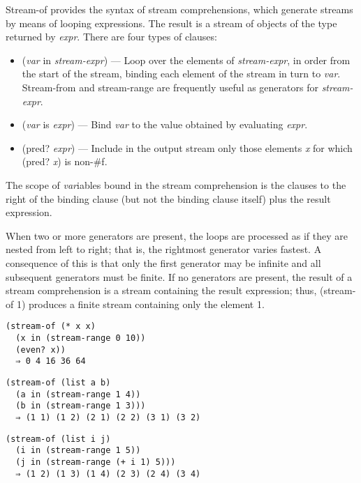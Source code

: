 \begin{entry}{%
  }

  Stream-of provides the syntax of stream comprehensions, which
  generate streams by means of looping expressions. The result is a
  stream of objects of the type returned by \emph{expr}. There are
  four types of clauses:

\begin{itemize}
  \tightlist
\item (\emph{var} in \emph{stream-expr}) --- Loop over the elements of
  \emph{stream-expr}, in order from the start of the stream, binding
  each element of the stream in turn to \emph{var}. Stream-from and
  stream-range are frequently useful as generators for
  \emph{stream-expr}.
\item (\emph{var} is \emph{expr}) --- Bind \emph{var} to the value
  obtained by evaluating \emph{expr}.
\item (pred? \emph{expr}) --- Include in the output stream only those
  elements \emph{x} for which (pred? \emph{x}) is non-\#f.
\end{itemize}

The scope of \emph{var}iables bound in the stream comprehension is the
clauses to the right of the binding clause (but not the binding clause
itself) plus the result expression.

When two or more generators are present, the loops are processed as if
they are nested from left to right; that is, the rightmost generator
varies fastest. A consequence of this is that only the first generator
may be infinite and all subsequent generators must be finite. If no
generators are present, the result of a stream comprehension is a
stream containing the result expression; thus, (stream-of 1) produces
a finite stream containing only the element 1.

\begin{verbatim}
(stream-of (* x x)
  (x in (stream-range 0 10))
  (even? x))
  ⇒ 0 4 16 36 64
\end{verbatim}

\begin{verbatim}
(stream-of (list a b)
  (a in (stream-range 1 4))
  (b in (stream-range 1 3))) 
  ⇒ (1 1) (1 2) (2 1) (2 2) (3 1) (3 2)
\end{verbatim}

\begin{verbatim}
(stream-of (list i j)
  (i in (stream-range 1 5))
  (j in (stream-range (+ i 1) 5)))
  ⇒ (1 2) (1 3) (1 4) (2 3) (2 4) (3 4)
\end{verbatim}

\end{entry}

